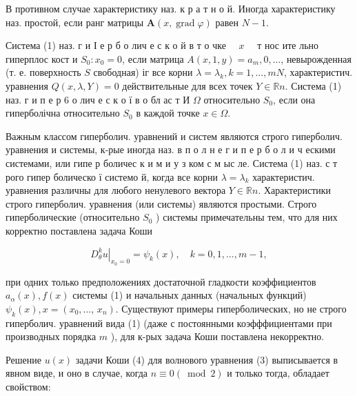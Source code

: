\documentclass[10pt]{article}
\begin{document}
В противном случае характеристику наз. к р а т н о й. Иногда характеристику наз. простой, если ранг матрицы $\boldsymbol{A}(x, \operatorname{grad} \varphi)$ равен $N-1$.



Система (1) наз. г и І е р б о лич е с к о й в т о чке $\quad x \quad$ т нос ите льно гиперплос кост и $S_{0}: x_{0}=0$, если матрица $A(x, 1, y)=a_{m}, 0, \ldots$, невырожденная (т. е. поверхность $S$ свободная) іг все корни $\lambda=\lambda_{k}, k=1, \ldots, m N$, характеристич. уравнения $Q(x, \lambda, Y)=0$ действительные для всех точек $Y \in \mathbb{R} n$. Система (1) наз. г и п е р 6 о лич е с к о ї в о бл ас т И $\Omega$ относительно $S_{0}$, если она гиперболічна относительно $S_{0}$ в каждой точке $x \in \Omega$.



Важным классом гиперболич. уравнений и систем являются строго гиперболич. уравнения и системы, к-рые иногда наз. в п о л н е г и п е р б о л и ч ескими системами, или гипе р боличес к и м и у з ком с м ыс ле. Система (1) наз. с т рого гипер болическо ї системо й, когда все корни $\lambda=\lambda_{k}$ характеристич. уравнения различны для любого ненулевого вектора $Y \in \mathbb{R} n$. Характеристики строго гиперболич. уравнения (или системы) являются простыми. Строго гиперболические (относительно $S_{0}$ ) системы примечательны тем, что для них корректно поставлена задача Коши



\[

\left.D_{\theta}^{k} u\right|_{x_{0}=0}=\psi_{k}(x), \quad k=0,1, \ldots, m-1,

\]



при одних только предположениях достаточной гладкости коэффициентов $a_{\alpha}(x), f(x)$ системы (1) и начальных данных (начальных функций) $\psi_{k}(x), x=\left(x_{0}, \ldots\right.$, $\left.x_{n}\right)$. Существуют примеры гиперболических, но не строго гиперболич. уравнений вида (1) (даже с постоянными коэфффициентами при производных порядка $m$ ), для к-рых задача Коши поставлена некорректно.



Решение $u(x)$ задачи Коши (4) для волнового уравнения (3) выписывается в явном виде, и оно в случае, когда $n \equiv 0(\bmod 2)$ и только тогда, обладает свойством:
\end{document}
